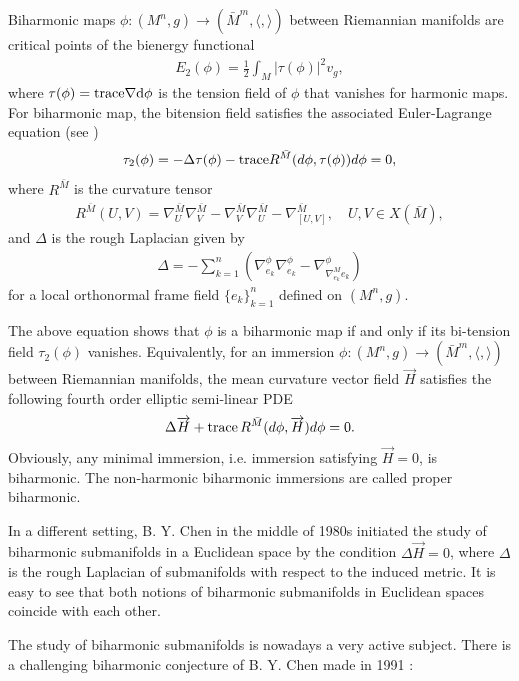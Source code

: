 \documentclass[twoside,reqno,A4]{amsart}
\theoremstyle{definition}
\theoremstyle{remark}
\numberwithin{equation}{section}
\begin{document}
Biharmonic maps
$\phi:(M^n,g)\longrightarrow(\bar{M}^m,\langle,\rangle)$ between
Riemannian manifolds are critical points of the bienergy functional
\begin{eqnarray*}
E_2(\phi)=\frac{1}{2}\int_M|\tau(\phi)|^2v_g,
\end{eqnarray*}
where $\tau(\phi)= {\rm trace \nabla d\phi}$ is the tension field of
$\phi$ that vanishes for harmonic maps. For biharmonic map, the
bitension field satisfies the associated Euler-Lagrange equation
(see \cite{jiang1986})
\begin{eqnarray*}
\tau_2(\phi)=-\Delta\tau(\phi)-{\rm trace}
R^{\bar{M}}(d\phi,\tau(\phi))d\phi=0,
\end{eqnarray*}
where $R^{\bar{M}}$ is the curvature tensor
\begin{eqnarray*}
R^{\bar{M}}(U,V)=\nabla_U^{\bar{M}}\nabla_V^{\bar{M}}-
\nabla_V^{\bar{M}}\nabla_U^{\bar{M}}-\nabla_{[U, V]}^{\bar{M}},\quad
U, V\in X(\bar{M}),
\end{eqnarray*}
and $\Delta$ is the rough Laplacian given by
\begin{eqnarray*}
\Delta=-\sum_{k=1}^n(\nabla^{\phi}_{e_k}\nabla^{\phi}_{e_k}-\nabla^{\phi}_{\nabla^{M}_{e_k}e_k})
\end{eqnarray*}
for a local orthonormal frame field $\{e_k\}_{k=1}^n$ defined on
$(M^n, g)$.

The above equation shows that $\phi$ is a biharmonic map if and only
if its bi-tension field $\tau_2(\phi)$ vanishes. Equivalently, for
an immersion
$\phi:(M^n,g)\longrightarrow(\bar{M}^m,\langle,\rangle)$ between
Riemannian manifolds, the mean curvature vector field
$\overrightarrow{H}$ satisfies the following fourth order elliptic
semi-linear PDE
\begin{eqnarray}
\Delta\overrightarrow{H}+{\rm trace}\,
R^{\bar{M}}(d\phi,\overrightarrow{H})d\phi=0.
\end{eqnarray}
Obviously, any minimal immersion, i.e. immersion satisfying
$\overrightarrow{H}=0$, is biharmonic. The non-harmonic biharmonic
immersions are called proper biharmonic.


In a different setting, B. Y. Chen in the middle of 1980s initiated
the study of biharmonic submanifolds in a Euclidean space by the
condition $\Delta \overrightarrow{H}=0$, where $\Delta$ is the rough
Laplacian of submanifolds with respect to the induced metric. It is
easy to see that both notions of biharmonic submanifolds in
Euclidean spaces coincide with each other.

The study of biharmonic submanifolds is nowadays a very active
subject. There is a challenging biharmonic conjecture of B. Y. Chen
made in 1991 \cite{Chen1991}:
\end{document}
